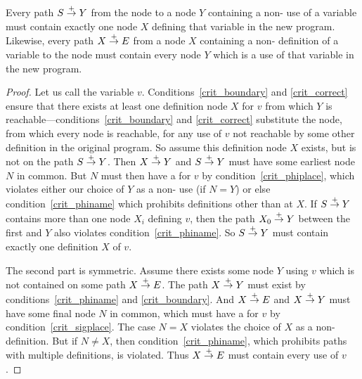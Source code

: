 \documentclass[12pt,titlepage,twoside]{article}
\begin{document}
\begin{property}\label{pty:ssi_dom}
Every path $S \stackrel{+}{\rightarrow} Y$ from the  node to a node $Y$
containing a non-\phifunction{} use of a variable must contain exactly
one node $X$ defining that variable in the new program.  Likewise,
every path $X \stackrel{+}{\rightarrow} E$ from a node $X$ containing a
non-\sigfunction{} definition of a variable to the  node
must contain every node $Y$ which is a use of that variable in the new
program.
\end{property}
\begin{proof}
Let us call the variable $v$.  Conditions~\ref{crit_boundary} and
\ref{crit_correct} ensure that there exists at least one definition
node $X$ for $v$ from which $Y$ is
reachable---conditions~\ref{crit_boundary} and \ref{crit_correct}
substitute the  node, from which every node is reachable,
for any use of $v$ not reachable by some other definition in the
original program.  So assume this definition node $X$ exists, but is
not on the path $S\stackrel{+}{\rightarrow} Y$.  Then $X\stackrel{+}{\rightarrow} Y$ and $S\stackrel{+}{\rightarrow}
Y$ must have some earliest node $N$ in common.  But $N$ must then have
a \phifunction{} for $v$ by condition~\ref{crit_phiplace}, which
violates either our choice of $Y$ as a non-\phifunction{} use (if
$N=Y$) or else condition~\ref{crit_phiname} which prohibits
definitions other than at $X$.  If $S\stackrel{+}{\rightarrow} Y$ contains more than
one node $X_i$ defining $v$, then the path $X_0\stackrel{+}{\rightarrow} Y$ between
the first and $Y$ also violates condition~\ref{crit_phiname}.  So
$S\stackrel{+}{\rightarrow} Y$ must contain exactly one definition $X$ of $v$.

The second part is symmetric.  Assume there exists some node $Y$ using
$v$ which is not contained on some path $X \stackrel{+}{\rightarrow} E$.  The path
$X\stackrel{+}{\rightarrow} Y$ must exist by conditions~\ref{crit_phiname} and
\ref{crit_boundary}.  And $X\stackrel{+}{\rightarrow} E$ and $X\stackrel{+}{\rightarrow} Y$ must
have some final node $N$ in common, which must have a \sigfunction{}
for $v$ by condition~\ref{crit_sigplace}. The case $N=X$ violates the
choice of $X$ as a non-\sigfunction{} definition.  But if $N\not= X$,
then condition~\ref{crit_phiname}, which prohibits paths with multiple
definitions, is violated.  Thus $X\stackrel{+}{\rightarrow} E$ must contain every use
of $v$.
\end{proof}
\end{document}
